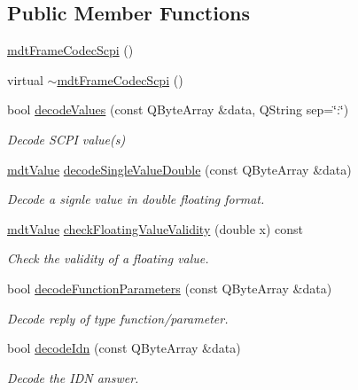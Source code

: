 \subsection*{Public Member Functions}
\begin{DoxyCompactItemize}
\item 
\hyperlink{classmdt_frame_codec_scpi_a577bc18bb6bd855024438b4c73b1499b}{mdt\-Frame\-Codec\-Scpi} ()
\item 
virtual \hyperlink{classmdt_frame_codec_scpi_aba6cd4da3eb6ea22cb45d282858c7949}{$\sim$mdt\-Frame\-Codec\-Scpi} ()
\item 
bool \hyperlink{classmdt_frame_codec_scpi_a37a1703b6daee6f6bf91c6afb46191b3}{decode\-Values} (const Q\-Byte\-Array \&data, Q\-String sep=\char`\"{}\-:\char`\"{})
\begin{DoxyCompactList}\small\item\em Decode S\-C\-P\-I value(s) \end{DoxyCompactList}\item 
\hyperlink{classmdt_value}{mdt\-Value} \hyperlink{classmdt_frame_codec_scpi_ad2d7b41d0b3413074d770c5f512bee12}{decode\-Single\-Value\-Double} (const Q\-Byte\-Array \&data)
\begin{DoxyCompactList}\small\item\em Decode a signle value in double floating format. \end{DoxyCompactList}\item 
\hyperlink{classmdt_value}{mdt\-Value} \hyperlink{classmdt_frame_codec_scpi_a90d550cfe0ed5605c63a064359fc762d}{check\-Floating\-Value\-Validity} (double x) const 
\begin{DoxyCompactList}\small\item\em Check the validity of a floating value. \end{DoxyCompactList}\item 
bool \hyperlink{classmdt_frame_codec_scpi_ac928eac971706f5c78f36d0ae4dc0c42}{decode\-Function\-Parameters} (const Q\-Byte\-Array \&data)
\begin{DoxyCompactList}\small\item\em Decode reply of type function/parameter. \end{DoxyCompactList}\item 
bool \hyperlink{classmdt_frame_codec_scpi_a6ddd1b8e23252dc7f03c279a030cb36f}{decode\-Idn} (const Q\-Byte\-Array \&data)
\begin{DoxyCompactList}\small\item\em Decode the I\-D\-N answer. \end{DoxyCompactList}\item 

\end{DoxyCompactItemize}
